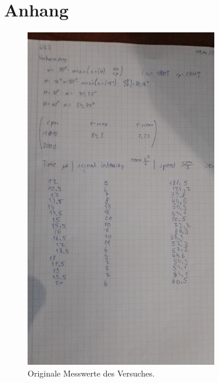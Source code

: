 \section{Anhang}
\label{sec:Anhang}

\begin{figure}[H]
    \centering
    \includegraphics[width=0.75\textwidth]{data/origDaten1.jpeg}
    \caption{Originale Messwerte des Versuches.}
    \label{fig:origDaten1}
\end{figure}

